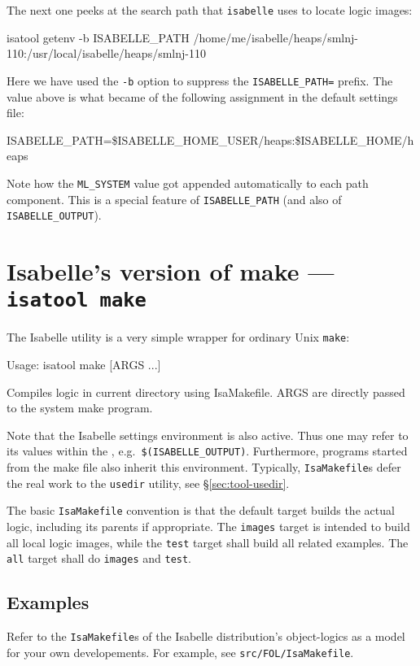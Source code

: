 The next one peeks at the search path that \texttt{isabelle} uses to
locate logic images:
\begin{ttbox}
isatool getenv -b ISABELLE_PATH
{\out /home/me/isabelle/heaps/smlnj-110:/usr/local/isabelle/heaps/smlnj-110}
\end{ttbox}
Here we have used the \texttt{-b} option to suppress the
\texttt{ISABELLE_PATH=} prefix.  The value above is what became of the
following assignment in the default settings file:
\begin{ttbox}
ISABELLE_PATH=\$ISABELLE_HOME_USER/heaps:\$ISABELLE_HOME/heaps
\end{ttbox}
Note how the \texttt{ML_SYSTEM} value got appended automatically to
each path component. This is a special feature of
\texttt{ISABELLE_PATH} (and also of \texttt{ISABELLE_OUTPUT}).


\section{Isabelle's version of make --- \texttt{isatool make}}

The Isabelle  utility is a very simple wrapper for
ordinary Unix \texttt{make}:
\begin{ttbox}
Usage: isatool make [ARGS ...]

  Compiles logic in current directory using IsaMakefile.
  ARGS are directly passed to the system make program.
\end{ttbox}
Note that the Isabelle settings environment is also active. Thus one
may refer to its values within the , e.g.\ 
\texttt{\$(ISABELLE_OUTPUT)}. Furthermore, programs started from the
make file also inherit this environment.  Typically,
\texttt{IsaMakefile}s defer the real work to the \texttt{usedir}
utility, see \S\ref{sec:tool-usedir}.

\medskip The basic \texttt{IsaMakefile} convention is that the default
target builds the actual logic, including its parents if appropriate.
The \texttt{images} target is intended to build all local logic
images, while the \texttt{test} target shall build all related
examples.  The \texttt{all} target shall do \texttt{images} and
\texttt{test}.


\subsection*{Examples}

Refer to the \texttt{IsaMakefile}s of the Isabelle distribution's
object-logics as a model for your own developements.  For example, see
\texttt{src/FOL/IsaMakefile}.


